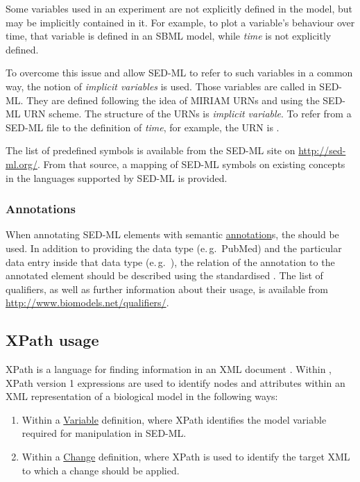 Some variables used in an experiment are not explicitly defined in the model, but may be implicitly contained in it. 
For example, to plot a variable's behaviour over time, that variable is defined in an SBML model, while \emph{time} is not explicitly defined. 

To overcome this issue and allow SED-ML to refer to such variables in a common way, the notion of \emph{implicit variables} is used.
Those variables are called  in SED-ML. They are defined following the idea of MIRIAM URNs and using the SED-ML URN scheme. The structure of the URNs is \emph{implicit variable}.
To refer from a SED-ML file to the definition of \emph{time}, for example, the URN is .

The list of predefined symbols is available from the SED-ML site on \url{http://sed-ml.org/}.
From that source, a mapping of SED-ML symbols on existing concepts in the languages supported by SED-ML is provided.

\subsubsection{Annotations}
\label{sec:annotations}
When annotating SED-ML elements with semantic \hyperref[class:annotation]{annotation}s, the  should be used. In addition to providing the data type (e.\,g.\ PubMed) and the particular data entry inside that data type (e.\,g.\ ), the relation of the annotation to the annotated element should be described using the standardised . The list of qualifiers, as well as further information about their usage, is available from \url{http://www.biomodels.net/qualifiers/}.


\subsection{XPath usage}  
\label{sec:xpath}
XPath is a language for finding information in an XML document \citep{xpath:1999}. Within \currentLV, XPath version 1 expressions are  used to identify nodes and attributes within an XML representation of a biological model in the following ways:

\begin{enumerate}
\item {Within a \hyperref[class:variable]{Variable} definition, where XPath identifies the model variable required for manipulation in SED-ML.}
\item {Within a  \hyperref[class:change]{Change} definition, where XPath is used to identify the target XML to which a change should be applied.} 

\end{enumerate}

